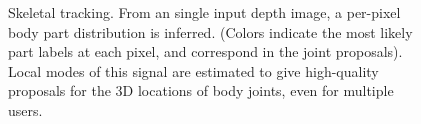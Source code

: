\begin{figure}
	\centering
	\quad
	\caption{Skeletal tracking. From an single input depth image, a per-pixel body part distribution is inferred. (Colors indicate the most likely part labels at each pixel, and correspond in the joint proposals). Local modes of this signal are estimated to give high-quality proposals for the 3D locations of body joints, even for multiple users.}
	\label{fig:2-bg:skeleton}
\end{figure}

